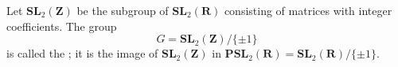 Let $\mathbf{SL}_2(\mathbf{Z})$ be the subgroup of $\mathbf{SL}_2(\mathbf{R})$ consisting of matrices with integer coefficients. The group
$$G = \mathbf{SL}_2(\mathbf{Z}) / \{\pm 1\}$$
is called the ; it is the image of $\mathbf{SL}_2(\mathbf{Z})$ in $\mathbf{PSL}_2(\mathbf{R}) = \mathbf{SL}_2(\mathbf{R}) / \{\pm 1\}$.
